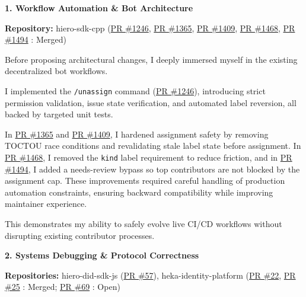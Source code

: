 \documentclass[11pt]{article}
\newcommand{\mainheading}[1]{\par\vspace{10pt}\noindent{\fontsize{15pt}{18pt}\selectfont\textcolor{headingblue}{#1}}
\par\vspace{4pt}}
\begin{document}
\mainheading{2. Pre-Application Contributions \& Ecosystem Alignment}

\textbf{1. Workflow Automation \& Bot Architecture}

\textbf{Repository:} hiero-sdk-cpp (\href{https://github.com/hiero-ledger/hiero-sdk-cpp/pull/1246}{PR \#1246}, \href{https://github.com/hiero-ledger/hiero-sdk-cpp/pull/1365}{PR \#1365}, \href{https://github.com/hiero-ledger/hiero-sdk-cpp/pull/1409}{PR \#1409}, \href{https://github.com/hiero-ledger/hiero-sdk-cpp/pull/1468}{PR \#1468}, \href{https://github.com/hiero-ledger/hiero-sdk-cpp/pull/1494}{PR \#1494} : Merged)

Before proposing architectural changes, I deeply immersed myself in the existing decentralized bot workflows. 

I implemented the \texttt{/unassign} command (\href{https://github.com/hiero-ledger/hiero-sdk-cpp/pull/1246}{PR \#1246}), introducing strict permission validation, issue state verification, and automated label reversion, all backed by targeted unit tests. 

In \href{https://github.com/hiero-ledger/hiero-sdk-cpp/pull/1365}{PR \#1365} and \href{https://github.com/hiero-ledger/hiero-sdk-cpp/pull/1409}{PR \#1409}, I hardened assignment safety by removing TOCTOU race conditions and revalidating stale label state before assignment. In \href{https://github.com/hiero-ledger/hiero-sdk-cpp/pull/1468}{PR \#1468}, I removed the \texttt{kind} label requirement to reduce friction, and in \href{https://github.com/hiero-ledger/hiero-sdk-cpp/pull/1494}{PR \#1494}, I added a needs-review bypass so top contributors are not blocked by the assignment cap. These improvements required careful handling of production automation constraints, ensuring backward compatibility while improving maintainer experience. 

This demonstrates my ability to safely evolve live CI/CD workflows without disrupting existing contributor processes.

\textbf{2. Systems Debugging \& Protocol Correctness}

\textbf{Repositories:} hiero-did-sdk-js (\href{https://github.com/hiero-ledger/hiero-did-sdk-js/pull/57}{PR \#57}), heka-identity-platform (\href{https://github.com/hiero-ledger/heka-identity-platform/pull/22}{PR \#22}, \href{https://github.com/hiero-ledger/heka-identity-platform/pull/25}{PR \#25} : Merged; \href{https://github.com/hiero-ledger/heka-identity-platform/pull/69}{PR \#69} : Open)
\end{document}
